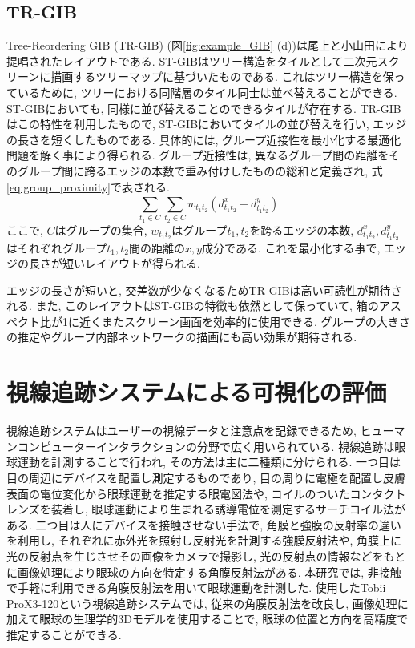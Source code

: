 \documentclass{kuee}
\begin{document}
\subsection{TR-GIB}
Tree-Reordering GIB (TR-GIB) (図\ref{fig:example_GIB} (d))は尾上と小山田により提唱されたレイアウトである.
ST-GIBはツリー構造をタイルとして二次元スクリーンに描画するツリーマップに基づいたものである.
これはツリー構造を保っているために, ツリーにおける同階層のタイル同士は並べ替えることができる.
ST-GIBにおいても, 同様に並び替えることのできるタイルが存在する.
TR-GIBはこの特性を利用したもので, ST-GIBにおいてタイルの並び替えを行い, エッジの長さを短くしたものである.
具体的には, グループ近接性を最小化する最適化問題を解く事により得られる.
グループ近接性は, 異なるグループ間の距離をそのグループ間に跨るエッジの本数で重み付けしたものの総和と定義され, 式\ref{eq:group_proximity}で表される.
\begin{equation}
\label{eq:group_proximity}
  \sum_{t_1 \in C}^{} \sum_{t_2 \in C}^{} w_{t_1 t_2}(d_{t_1 t_2}^x + d_{t_1 t_2}^y)
\end{equation}
ここで, $C$はグループの集合, $w_{t_1 t_2}$はグループ$t_1, t_2$を跨るエッジの本数, $d_{t_1 t_2}^x, d_{t_1 t_2}^y$はそれぞれグループ$t_1, t_2$間の距離の$x, y$成分である.
これを最小化する事で, エッジの長さが短いレイアウトが得られる.

エッジの長さが短いと, 交差数が少なくなるためTR-GIBは高い可読性が期待される.
また, このレイアウトはST-GIBの特徴も依然として保っていて, 箱のアスペクト比が1に近くまたスクリーン画面を効率的に使用できる.
グループの大きさの推定やグループ内部ネットワークの描画にも高い効果が期待される.


\section{視線追跡システムによる可視化の評価}
\label{sec:evaluation_with_eyetracking}
視線追跡システムはユーザーの視線データと注意点を記録できるため, ヒューマンコンピューターインタラクションの分野で広く用いられている\cite{andrienko2012visual,duchowski2007eye,kurzhals2014evaluating}.
視線追跡は眼球運動を計測することで行われ, その方法は主に二種類に分けられる.
一つ目は目の周辺にデバイスを配置し測定するものであり, 目の周りに電極を配置し皮膚表面の電位変化から眼球運動を推定する眼電図法や, コイルのついたコンタクトレンズを装着し, 眼球運動により生まれる誘導電位を測定するサーチコイル法がある.
二つ目は人にデバイスを接触させない手法で, 角膜と強膜の反射率の違いを利用し, それぞれに赤外光を照射し反射光を計測する強膜反射法や, 角膜上に光の反射点を生じさせその画像をカメラで撮影し, 光の反射点の情報などをもとに画像処理により眼球の方向を特定する角膜反射法がある.
本研究では, 非接触で手軽に利用できる角膜反射法を用いて眼球運動を計測した.
使用したTobii ProX3-120という視線追跡システムでは, 従来の角膜反射法を改良し, 画像処理に加えて眼球の生理学的3Dモデルを使用することで, 眼球の位置と方向を高精度で推定することができる.
\end{document}
